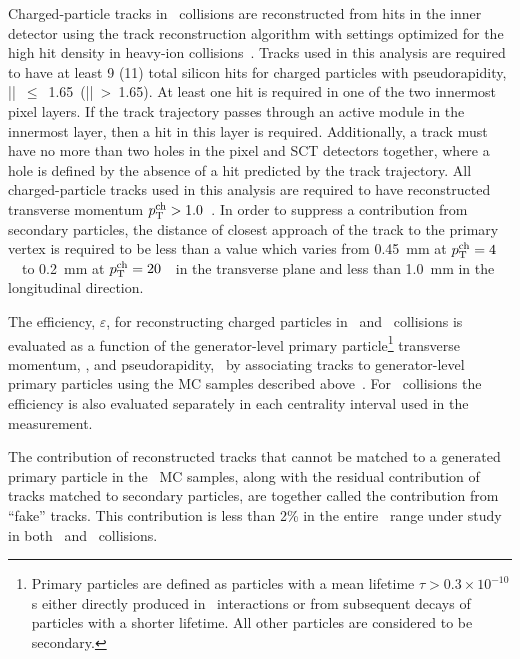 Charged-particle tracks in \pbpb\ collisions are reconstructed from hits in the inner detector using the 
track reconstruction algorithm with settings optimized for the high hit density in heavy-ion
collisions~\cite{Aaboud:2017all}.
Tracks used in this analysis  are required to have at least 9 (11) total silicon hits for charged particles with pseudorapidity,  \mbox{|\etatrk| $\leq$ 1.65 (|\etatrk| > 1.65)}.  At least one hit is required in one of the two innermost pixel layers.
If the track trajectory passes through an active module in the innermost layer, then 
a hit in this layer is required. Additionally, a track must 
have no more than two holes in the pixel and SCT detectors together, where 
a hole is defined by the absence of a hit predicted by the track 
trajectory. 
All charged-particle tracks used in this analysis are required to have reconstructed transverse momentum $\mbox{$p_{\mathrm{T}}^{\mathrm{ch}}$} > 1.0 $~\GeV. In order to suppress a contribution from
secondary particles, the distance of closest approach of the track to the primary vertex is required to be less than a value which varies from  0.45~mm at $\mbox{$p_{\mathrm{T}}^{\mathrm{ch}}$}=4$~\GeV\ to 0.2~mm at $\mbox{$p_{\mathrm{T}}^{\mathrm{ch}}$}=20$~\GeV\ in the transverse plane and less than 1.0~mm in the longitudinal direction.


The efficiency, $\varepsilon$, for reconstructing charged particles in \PbPb\ and \pp\ collisions is evaluated as a function of the generator-level primary particle\footnote{Primary particles are defined as particles with a mean lifetime $\tau>0.3\times 10^{-10}$s either directly produced in \pp\ interactions or from subsequent decays of particles with a shorter lifetime. All other particles are considered to be secondary.} transverse momentum, \pTtrue, and pseudorapidity, \etatrue\, by associating tracks to generator-level primary particles using the MC samples described above~\cite{Aad:2010ah}. For \pbpb\ collisions the efficiency is also evaluated separately in each centrality interval used in the measurement.
     
The contribution of reconstructed tracks that cannot be matched to a generated primary particle in the \pp\ MC samples, along with the residual contribution of tracks matched to secondary particles, are together called the contribution from ``fake'' tracks. This contribution is less than 2\% in the entire \pttrk\ range under study in both \pp\ and \pbpb\ collisions.  








